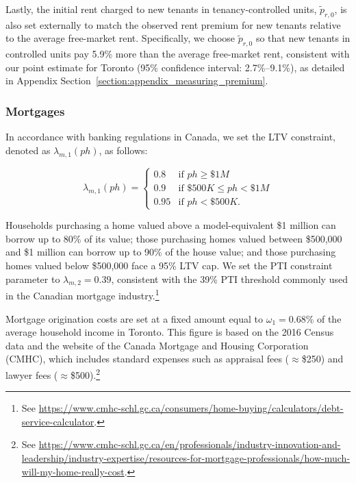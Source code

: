 \documentclass[parskip=full]{article}
\begin{document}

Lastly, the initial rent charged to new tenants in tenancy-controlled units, $\tilde{p}_{r,0}$, is also set externally to match the observed rent premium for new tenants relative to the average free-market rent. Specifically, we choose $\tilde{p}_{r,0}$ so that new tenants in controlled units pay 5.9\% more than the average free-market rent, consistent with our point estimate for Toronto (95\% confidence interval: 2.7\%–9.1\%), as detailed in Appendix Section~\ref{section:appendix_measuring_premium}.

\subsubsection{Mortgages}

In accordance with banking regulations in Canada, we set the LTV constraint, denoted as $\lambda_{m,1}(ph)$, as follows:

\begin{equation*}
\lambda_{m,1}(ph) = \begin{cases}
0.8 &\text{if $ph\geq \$1M$}\\
0.9 &\text{if $\$500K\leq ph< \$1M$}\\
0.95 &\text{if $ph < \$500K$}.
\end{cases}
\end{equation*}

\noindent Households purchasing a home valued above a model-equivalent \$1 million can borrow up to 80\% of its value; those purchasing homes valued between \$500,000 and \$1 million can borrow up to 90\% of the house value; and those purchasing homes valued below \$500,000 face a 95\% LTV cap. We set the PTI constraint parameter to $\lambda_{m,2}=0.39$, consistent with the 39\% PTI threshold commonly used in the Canadian mortgage industry.\footnote{See \url{https://www.cmhc-schl.gc.ca/consumers/home-buying/calculators/debt-service-calculator}.}

Mortgage origination costs are set at a fixed amount equal to $\omega_{1}=0.68\%$ of the average household income in Toronto. This figure is based on the 2016 Census data and the website of the Canada Mortgage and Housing Corporation (CMHC), which includes standard expenses such as appraisal fees ($\approx$\$250) and lawyer fees ($\approx$\$500).\footnote{See \url{https://www.cmhc-schl.gc.ca/en/professionals/industry-innovation-and-leadership/industry-expertise/resources-for-mortgage-professionals/how-much-will-my-home-really-cost}.}
\end{document}
